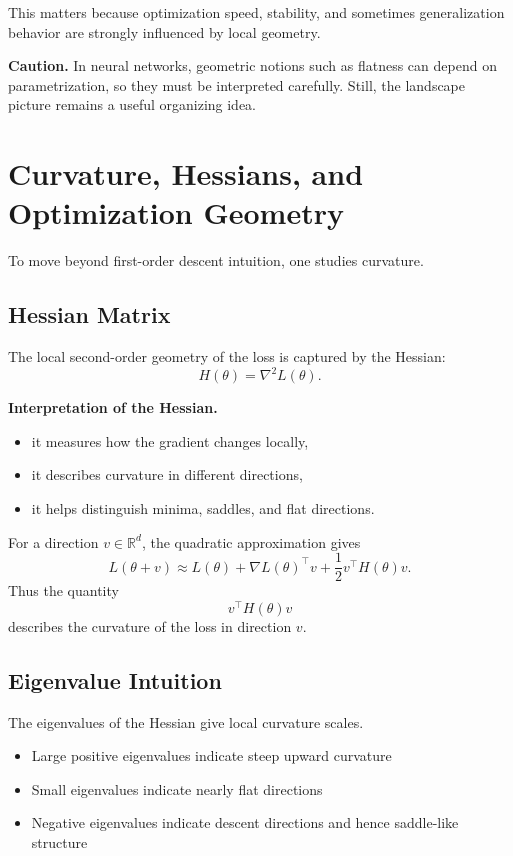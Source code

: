 \medskip

\noindent
This matters because optimization speed, stability, and sometimes generalization behavior are strongly influenced by local geometry.

\medskip

\noindent
\textbf{Caution.}
In neural networks, geometric notions such as flatness can depend on parametrization, so they must be interpreted carefully. Still, the landscape picture remains a useful organizing idea.

\section{Curvature, Hessians, and Optimization Geometry}

To move beyond first-order descent intuition, one studies curvature.

\subsection{Hessian Matrix}

The local second-order geometry of the loss is captured by the Hessian:
\[
H(\theta)=\nabla^2 L(\theta).
\]

\medskip

\noindent
\textbf{Interpretation of the Hessian.}
\begin{itemize}
    \item it measures how the gradient changes locally,
    \item it describes curvature in different directions,
    \item it helps distinguish minima, saddles, and flat directions.
\end{itemize}

\medskip

\noindent
For a direction \(v \in \mathbb{R}^d\), the quadratic approximation gives
\[
L(\theta + v) \approx L(\theta) + \nabla L(\theta)^\top v + \frac12 v^\top H(\theta) v.
\]
Thus the quantity
\[
v^\top H(\theta) v
\]
describes the curvature of the loss in direction \(v\).

\subsection{Eigenvalue Intuition}

The eigenvalues of the Hessian give local curvature scales.

\begin{itemize}
    \item Large positive eigenvalues indicate steep upward curvature
    \item Small eigenvalues indicate nearly flat directions
    \item Negative eigenvalues indicate descent directions and hence saddle-like structure
\end{itemize}


